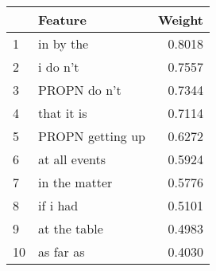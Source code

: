\begin{tabular}{llr}
\toprule
{} &           Feature &  Weight \\
\midrule
1  &         in by the &  0.8018 \\
2  &          i do n't &  0.7557 \\
3  &      PROPN do n't &  0.7344 \\
4  &        that it is &  0.7114 \\
5  &  PROPN getting up &  0.6272 \\
6  &     at all events &  0.5924 \\
7  &     in the matter &  0.5776 \\
8  &          if i had &  0.5101 \\
9  &      at the table &  0.4983 \\
10 &         as far as &  0.4030 \\
\bottomrule
\end{tabular}
